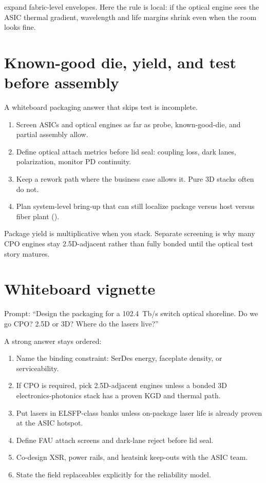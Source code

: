  expand fabric-level envelopes. Here the
rule is local: if the optical engine sees the ASIC thermal gradient, wavelength
and life margins shrink even when the room looks fine.

\section{Known-good die, yield, and test before assembly}
\label{sec:pkg-kgd}

A whiteboard packaging answer that skips test is incomplete.

\begin{enumerate}
\item Screen ASICs and optical engines as far as probe, known-good-die, and
      partial assembly allow.
\item Define optical attach metrics before lid seal: coupling loss, dark
      lanes, polarization, monitor PD continuity.
\item Keep a rework path where the business case allows it. Pure 3D stacks
      often do not.
\item Plan system-level bring-up that can still localize package versus host
      versus fiber plant ().
\end{enumerate}

Package yield is multiplicative when you stack. Separate screening is why many
CPO engines stay 2.5D-adjacent rather than fully bonded until the optical test
story matures.

\section{Whiteboard vignette}
\label{sec:pkg-vignette}

Prompt: ``Design the packaging for a 102.4~Tb/s switch optical shoreline.
Do we go CPO? 2.5D or 3D? Where do the lasers live?''

A strong answer stays ordered:

\begin{enumerate}
\item Name the binding constraint: SerDes energy, faceplate density, or
      serviceability.
\item If CPO is required, pick 2.5D-adjacent engines unless a bonded 3D
      electronics-photonics stack has a proven KGD and thermal path.
\item Put lasers in ELSFP-class banks unless on-package laser life is already
      proven at the ASIC hotspot.
\item Define FAU attach screens and dark-lane reject before lid seal.
\item Co-design XSR, power rails, and heatsink keep-outs with the ASIC team.
\item State the field replaceables explicitly for the reliability model.
\end{enumerate}

